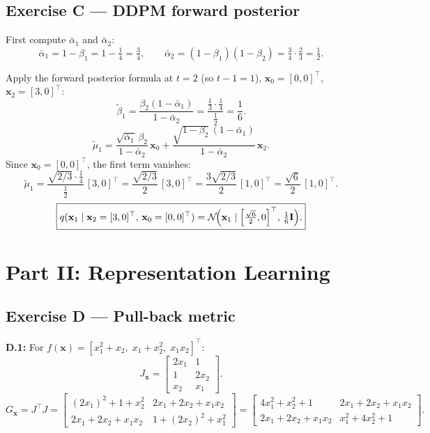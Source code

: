 \documentclass[12pt,a4paper]{article}
\newcommand{\N}{\mathcal{N}}
\begin{document}
\subsection*{Exercise C --- DDPM forward posterior}

First compute $\bar\alpha_1$ and $\bar\alpha_2$:
\[
  \bar\alpha_1=1-\beta_1=1-\tfrac{1}{4}=\tfrac{3}{4},\qquad
  \bar\alpha_2=(1-\beta_1)(1-\beta_2)=\tfrac{3}{4}\cdot\tfrac{2}{3}=\tfrac{1}{2}.
\]

Apply the forward posterior formula at $t=2$ (so $t-1=1$), $\mathbf{x}_0=[0,0]^\top$, $\mathbf{x}_2=[3,0]^\top$:
\[
  \tilde\beta_1=\frac{\beta_2(1-\bar\alpha_1)}{1-\bar\alpha_2}
  =\frac{\tfrac{1}{3}\cdot\tfrac{1}{4}}{\tfrac{1}{2}}=\frac{1}{6}.
\]
\[
  \tilde\mu_1
  =\frac{\sqrt{\bar\alpha_1}\,\beta_2}{1-\bar\alpha_2}\,\mathbf{x}_0
  +\frac{\sqrt{1-\beta_2}\,(1-\bar\alpha_1)}{1-\bar\alpha_2}\,\mathbf{x}_2.
\]
Since $\mathbf{x}_0=[0,0]^\top$, the first term vanishes:
\[
  \tilde\mu_1
  =\frac{\sqrt{2/3}\cdot\tfrac{1}{4}}{\tfrac{1}{2}}\,[3,0]^\top
  =\frac{\sqrt{2/3}}{2}\,[3,0]^\top
  =\frac{3\sqrt{2/3}}{2}\,[1,0]^\top
  =\frac{\sqrt{6}}{2}\,[1,0]^\top.
\]
\[
  \boxed{q(\mathbf{x}_1\mid\mathbf{x}_2=[3,0]^\top,\,\mathbf{x}_0=[0,0]^\top)
  =\N\!\Bigl(\mathbf{x}_1\mid\Bigl[\tfrac{\sqrt{6}}{2},0\Bigr]^\top,\,\tfrac{1}{6}\mathbf{I}\Bigr).}
\]

\newpage
\section*{Part II: Representation Learning}

\subsection*{Exercise D --- Pull-back metric}

\textbf{D.1:} For $f(\mathbf{x})=[x_1^2+x_2,\;x_1+x_2^2,\;x_1 x_2]^\top$:
\[
  J_\mathbf{x}=\begin{bmatrix}2x_1&1\\1&2x_2\\x_2&x_1\end{bmatrix}.
\]
\[
  G_\mathbf{x}=J^\top J=\begin{bmatrix}
    (2x_1)^2+1+x_2^2 & 2x_1+2x_2+x_1x_2\\
    2x_1+2x_2+x_1x_2 & 1+(2x_2)^2+x_1^2
  \end{bmatrix}
  =\begin{bmatrix}
    4x_1^2+x_2^2+1 & 2x_1+2x_2+x_1x_2\\
    2x_1+2x_2+x_1x_2 & x_1^2+4x_2^2+1
  \end{bmatrix}.
\]
\end{document}
